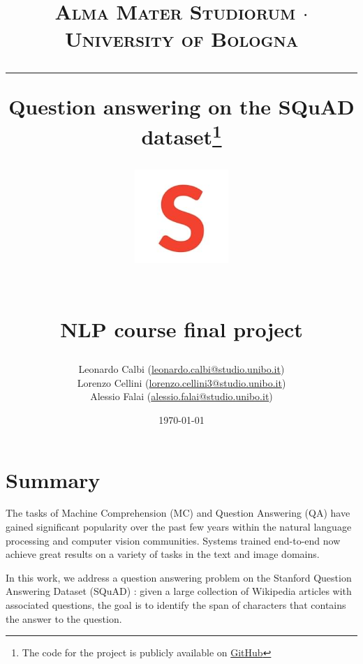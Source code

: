 \documentclass[a4paper,10pt]{report}
\begin{document}
\frenchspacing

\title{
  {{\large{\textsc{Alma Mater Studiorum $\cdot$ University of Bologna}}}}
  \rule{\textwidth}{0.4pt}\vspace{3mm}
  \textbf{Question answering on the SQuAD dataset\footnote{The code for the project is publicly available on \href{https://github.com/Wadaboa/squad-question-answering}{GitHub}}}
  \begin{figure}[!htb]
    \centering
    \includegraphics[width = 100pt]{squad-logo}
  \end{figure} \\
  NLP course final project
}

\author{Leonardo Calbi (\href{mailto:leonardo.calbi@studio.unibo.it}{leonardo.calbi@studio.unibo.it}) \\ Lorenzo Cellini (\href{mailto:lorenzo.cellini3@studio.unibo.it}{lorenzo.cellini3@studio.unibo.it}) \\ Alessio Falai (\href{mailto:alessio.falai@studio.unibo.it}{alessio.falai@studio.unibo.it})}
\date{\today}
\maketitle
\newpage
\tableofcontents
\setcounter{tocdepth}{1}
\newpage


\chapter{Summary}\label{chap:introduction}

The tasks of Machine Comprehension (MC) and Question Answering (QA) have gained significant popularity over the past few years within the natural language processing and computer vision communities. Systems trained end-to-end now achieve great results on a variety of tasks in the text and image domains.

In this work, we address a question answering problem on the Stanford Question Answering Dataset (SQuAD) \cite{squad-explorer}: given a large collection of Wikipedia articles with associated questions, the goal is to identify the span of characters that contains the answer to the question.
\end{document}
